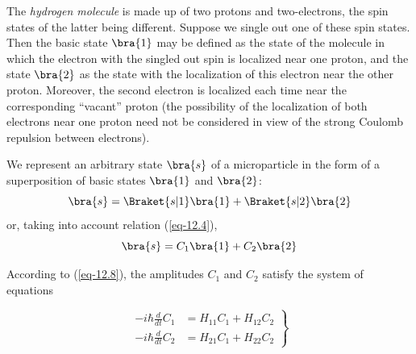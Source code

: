 \documentclass[a4paper,sfsidenotes,colorlinks=true]{tufte-book}
\numberwithin{equation}{section}
\numberwithin{figure}{section}
\begin{document}
The \emph{hydrogen molecule} is made up of two protons and
two-electrons, the spin states of the latter being different. Suppose
we single out one of these spin states. Then the basic state  $\bra{1}$ may
be defined as the state of the molecule in which the electron with
the singled out spin is localized near one proton, and the state  $\bra{2}$
as the state with the localization of this electron near the other
proton. Moreover, the second electron is localized each time near the
corresponding ``vacant'' proton (the possibility of the localization
of both electrons near one proton need not be considered in view of
the strong Coulomb repulsion between electrons).

We  represent an arbitrary state  $\bra{s}$ of a microparticle in the
form of a superposition of basic states  $\bra{1}$ and  $\bra{2}$:
\begin{equation*}%
 \bra{s} = \Braket{s | 1 }  \bra{1} +  \Braket{s | 2 }  \bra{2}
\end{equation*}
 or, taking into account relation (\ref{eq-12.4}),
\begin{equation}%
 \bra{s} = C_{1}  \bra{1} +  C_{2}  \bra{2}
\label{eq-13.1}
\end{equation}

 According to (\ref{eq-12.8}), the amplitudes $C_{1}$ and $C_{2}$ satisfy the
system of equations

\begin{equation}%
\left.
\begin{split}
- i \hbar \frac{d}{dt} C_{1} & = H_{11}C_{1}  + H_{12} C_{2} \\
- i \hbar \frac{d}{dt} C_{2} & = H_{21}C_{1}  + H_{22} C_{2} 
\end{split}
\right\}
\label{eq-13.2}
\end{equation}
\end{document}
